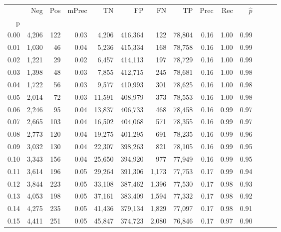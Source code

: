 \begin{tabular}{rrrrrrrrrrrrrr}
\toprule
{} &    Neg &    Pos & mPrec &       TN &       FP &      FN &      TP &  Prec &   Rec & $\hat{p}$ \\
p    &        &        &       &          &          &         &         &       &       &           \\
\midrule
0.00 &  4,206 &    122 &  0.03 &    4,206 &  416,364 &     122 &  78,804 &  0.16 &  1.00 &      0.99 \\
0.01 &  1,030 &     46 &  0.04 &    5,236 &  415,334 &     168 &  78,758 &  0.16 &  1.00 &      0.99 \\
0.02 &  1,221 &     29 &  0.02 &    6,457 &  414,113 &     197 &  78,729 &  0.16 &  1.00 &      0.99 \\
0.03 &  1,398 &     48 &  0.03 &    7,855 &  412,715 &     245 &  78,681 &  0.16 &  1.00 &      0.98 \\
0.04 &  1,722 &     56 &  0.03 &    9,577 &  410,993 &     301 &  78,625 &  0.16 &  1.00 &      0.98 \\
0.05 &  2,014 &     72 &  0.03 &   11,591 &  408,979 &     373 &  78,553 &  0.16 &  1.00 &      0.98 \\
0.06 &  2,246 &     95 &  0.04 &   13,837 &  406,733 &     468 &  78,458 &  0.16 &  0.99 &      0.97 \\
0.07 &  2,665 &    103 &  0.04 &   16,502 &  404,068 &     571 &  78,355 &  0.16 &  0.99 &      0.97 \\
0.08 &  2,773 &    120 &  0.04 &   19,275 &  401,295 &     691 &  78,235 &  0.16 &  0.99 &      0.96 \\
0.09 &  3,032 &    130 &  0.04 &   22,307 &  398,263 &     821 &  78,105 &  0.16 &  0.99 &      0.95 \\
0.10 &  3,343 &    156 &  0.04 &   25,650 &  394,920 &     977 &  77,949 &  0.16 &  0.99 &      0.95 \\
0.11 &  3,614 &    196 &  0.05 &   29,264 &  391,306 &   1,173 &  77,753 &  0.17 &  0.99 &      0.94 \\
0.12 &  3,844 &    223 &  0.05 &   33,108 &  387,462 &   1,396 &  77,530 &  0.17 &  0.98 &      0.93 \\
0.13 &  4,053 &    198 &  0.05 &   37,161 &  383,409 &   1,594 &  77,332 &  0.17 &  0.98 &      0.92 \\
0.14 &  4,275 &    235 &  0.05 &   41,436 &  379,134 &   1,829 &  77,097 &  0.17 &  0.98 &      0.91 \\
0.15 &  4,411 &    251 &  0.05 &   45,847 &  374,723 &   2,080 &  76,846 &  0.17 &  0.97 &      0.90 \\

\end{tabular}
